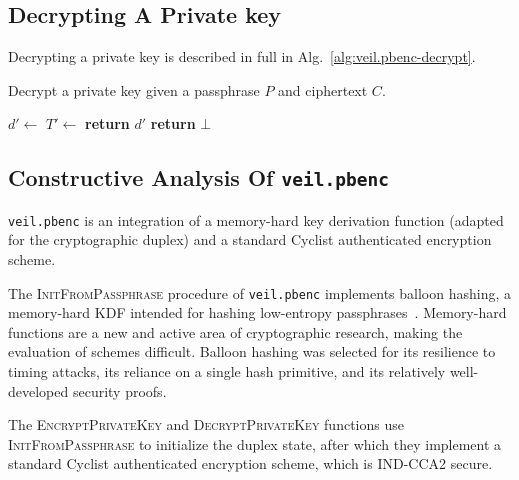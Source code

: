 \subsection{Decrypting A Private key}\label{subsec:veil.pbenc-decrypt}

Decrypting a private key is described in full in Alg.~\ref{alg:veil.pbenc-decrypt}\@.

\begin{algorithm}
    \caption{
        Decrypt a private key given a passphrase $P$ and ciphertext $C$.
    }
    \begin{algorithmic}
            \State {}
            \State $d' \gets$
            \State $T' \gets$
                \State \textbf{return} $d'$
            \Else
                \State \textbf{return} $\bot$
            \EndIf
        \EndFunction
    \end{algorithmic}
    \label{alg:veil.pbenc-decrypt}
\end{algorithm}

\subsection{Constructive Analysis Of \texttt{veil.pbenc}}\label{subsec:veil.pbenc-analysis}

\texttt{veil.pbenc} is an integration of a memory-hard key derivation function \@(adapted for the cryptographic duplex)
and a standard Cyclist authenticated encryption scheme.

The \textsc{InitFromPassphrase} procedure of \texttt{veil.pbenc} implements balloon hashing, a memory-hard KDF intended
for hashing low-entropy passphrases~\cite{boneh2016}.
Memory-hard functions are a new and active area of cryptographic research, making the evaluation of schemes difficult.
Balloon hashing was selected for its resilience to timing attacks, its reliance on a single hash primitive, and its
relatively well-developed security proofs.

The \textsc{EncryptPrivateKey} and \textsc{DecryptPrivateKey} functions use \textsc{InitFromPassphrase} to initialize
the duplex state, after which they implement a standard Cyclist authenticated encryption scheme, which is IND-CCA2
secure.
